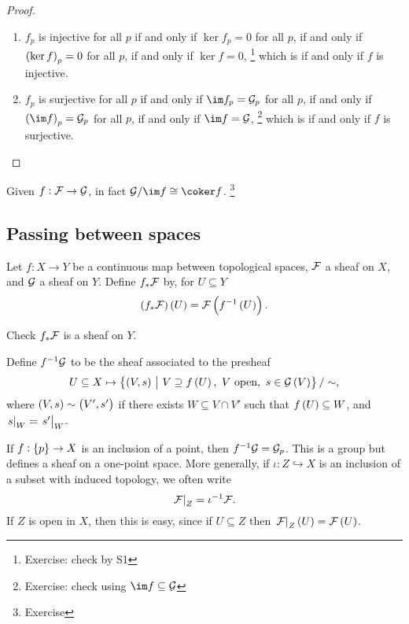 \begin{proof}
\hfill
\begin{enumerate}
\item $ f_p $ is injective for all $ p $ if and only if $ \ker f_p = 0 $ for all $ p $, if and only if $ \br{\ker f}_p = 0 $ for all $ p $, if and only if $ \ker f = 0 $, \footnote{Exercise: check by S1} which is if and only if $ f $ is injective.
\item $ f_p $ is surjective for all $ p $ if and only if $ \im f_p = \GGG_p $ for all $ p $, if and only if $ \br{\im f}_p = \GGG_p $ for all $ p $, if and only if $ \im f = \GGG $, \footnote{Exercise: check using $ \im f \subseteq \GGG $} which is if and only if $ f $ is surjective.
\end{enumerate}
\end{proof}

\begin{remark*}
Given $ f : \mathcal{F} \to \mathcal{G} $, in fact $ \GGG / \im f \cong \coker f $. \footnote{Exercise}
\end{remark*}

\subsection{Passing between spaces}


Let $ f : X \to Y $ be a continuous map between topological spaces, $ \mathcal{F} $ a sheaf on $ X $, and $ \mathcal{G} $ a sheaf on $ Y $. Define $ f_*\mathcal{F} $ by, for $ U \subseteq Y $
$$ \br{f_*\FFF}\br{U} = \FFF\br{f^{-1}\br{U}}. $$

\begin{exercise*}
Check $ f_*\mathcal{F} $ is a sheaf on $ Y $.
\end{exercise*}

Define $ f^{-1}\mathcal{G} $ to be the sheaf associated to the presheaf
$$ U \subseteq X \mapsto \cbr{\br{V, s} \st V \supseteq f\br{U}, \ V \ \text{open}, \ s \in \GGG\br{V}} / \sim, $$
where $ \br{V, s} \sim \br{V', s'} $ if there exists $ W \subseteq V \cap V' $ such that $ f\br{U} \subseteq W $, and $ \left. s \right|_W = \left. s' \right|_W $.

\begin{example*}
If $ f : \cbr{p} \to X $ is an inclusion of a point, then $ f^{-1}\mathcal{G} = \mathcal{G}_p $. This is a group but defines a sheaf on a one-point space. More generally, if $ \iota : Z \hookrightarrow X $ is an inclusion of a subset with induced topology, we often write
$$ \left. \mathcal{F} \right|_Z = \iota^{-1}\mathcal{F}. $$
If $ Z $ is open in $ X $, then this is easy, since if $ U \subseteq Z $ then $ \eval{\FFF}_Z\br{U} = \FFF\br{U} $.
\end{example*}

